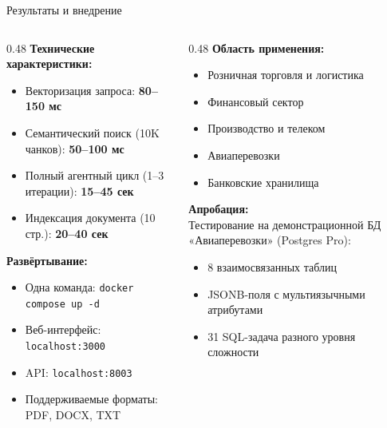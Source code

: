 \documentclass[10pt, aspectratio=169, unicode]{beamer}
\begin{document}
\begin{frame}{Результаты и внедрение}
  \begin{columns}[T]
    \begin{column}{0.48\textwidth}
      \textbf{Технические характеристики:}
      \begin{itemize}
        \item Векторизация запроса: \textbf{80–150 мс}
        \item Семантический поиск (10K чанков): \textbf{50–100 мс}
        \item Полный агентный цикл (1–3 итерации): \textbf{15–45 сек}
        \item Индексация документа (10 стр.): \textbf{20–40 сек}
      \end{itemize}

      \vspace{6pt}
      \textbf{Развёртывание:}
      \begin{itemize}
        \item Одна команда: \texttt{docker compose up -d}
        \item Веб-интерфейс: \texttt{localhost:3000}
        \item API: \texttt{localhost:8003}
        \item Поддерживаемые форматы: PDF, DOCX, TXT
      \end{itemize}
    \end{column}
    \begin{column}{0.48\textwidth}
      \textbf{Область применения:}
      \begin{itemize}
        \item Розничная торговля и логистика
        \item Финансовый сектор
        \item Производство и телеком
        \item Авиаперевозки
        \item Банковские хранилища
      \end{itemize}

      \vspace{6pt}
      \textbf{Апробация:}\\
      Тестирование на демонстрационной БД «Авиаперевозки» (Postgres Pro):
      \begin{itemize}
        \item 8 взаимосвязанных таблиц
        \item JSONB-поля с мультиязычными атрибутами
        \item 31 SQL-задача разного уровня сложности
      \end{itemize}
    \end{column}
  \end{columns}
\end{frame}
\end{document}
